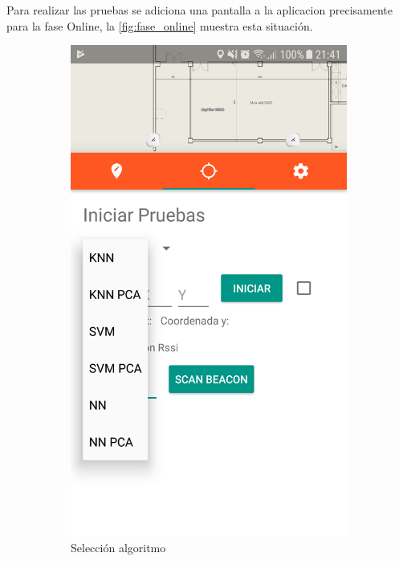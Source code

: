 Para realizar las pruebas se adiciona una pantalla a la aplicacion precisamente para la fase Online, la \autoref{fig:fase_online} muestra esta situación.

\begin{figure}[ht!]
\centering
\begin{subfigure}{.3\textwidth}
  \centering
  \includegraphics[width=.8\linewidth]{figures/fase_online1.png}
  \caption{Selección algoritmo}
  \label{fig:online1}
\end{subfigure}%
\begin{subfigure}{.3\textwidth}
  \centering

\end{subfigure}
\end{figure}
